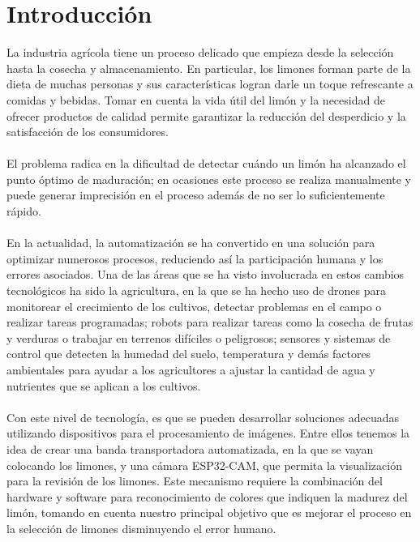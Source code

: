 
\section{Introducción}
La industria agrícola tiene un proceso delicado que empieza desde la selección hasta la cosecha y almacenamiento. En particular, los limones forman parte de la dieta de muchas personas y sus características logran darle un toque refrescante a comidas y bebidas. Tomar en cuenta la vida útil del limón y la necesidad de ofrecer productos de calidad permite garantizar la reducción del desperdicio y la satisfacción de los consumidores. \\\\
El problema radica en la dificultad de detectar cuándo un limón ha alcanzado el punto óptimo de maduración; en ocasiones este proceso se realiza manualmente y puede generar imprecisión en el proceso además de no ser lo suficientemente rápido. \\\\
En la actualidad, la automatización se ha convertido en una solución para optimizar numerosos procesos, reduciendo así la participación humana y los errores asociados. Una de las áreas que se ha visto involucrada en estos cambios tecnológicos ha sido la agricultura, en la que se ha hecho uso de drones para monitorear el crecimiento de los cultivos, detectar problemas en el campo o realizar tareas programadas; robots para realizar tareas como la cosecha de frutas y verduras o trabajar en terrenos difíciles o peligrosos; sensores y sistemas de control que detecten la humedad del suelo, temperatura y demás factores ambientales para ayudar a los agricultores a ajustar la cantidad de agua y nutrientes que se aplican a los cultivos. \\\\
Con este nivel de tecnología, es que se pueden desarrollar soluciones adecuadas utilizando dispositivos para el procesamiento de imágenes. Entre ellos tenemos la idea de crear una banda transportadora automatizada, en la que se vayan colocando los limones, y una cámara ESP32-CAM, que permita la visualización para la revisión de los limones. Este mecanismo requiere la combinación del hardware y software para reconocimiento de colores que indiquen la madurez del limón, tomando en cuenta nuestro principal objetivo que es mejorar el proceso en la selección de limones disminuyendo el error humano. 
